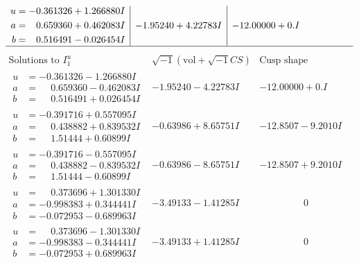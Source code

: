 \documentclass[1p]{elsarticle_modified}
\theoremstyle{definition}
\newcommand{\I}{\sqrt{-1}}
\begin{document}
$$\begin{array}{c|c|c}
\begin{aligned}
u &= -0.361326 + 1.266880 I \\
a &= \phantom{-}0.659360 + 0.462083 I \\
b &= \phantom{-}0.516491 - 0.026454 I\end{aligned}
 & -1.95240 + 4.22783 I & -12.00000 + 0. I\phantom{ +0.000000I}\\
 \hline 
 \end{array}$$\newpage$$\begin{array}{c|c|c}  
\text{Solutions to }I^u_{1}& \I (\text{vol} + \sqrt{-1}CS) & \text{Cusp shape}\\
 \hline 
\begin{aligned}
u &= -0.361326 - 1.266880 I \\
a &= \phantom{-}0.659360 - 0.462083 I \\
b &= \phantom{-}0.516491 + 0.026454 I\end{aligned}
 & -1.95240 - 4.22783 I & -12.00000 + 0. I\phantom{ +0.000000I} \\ \hline\begin{aligned}
u &= -0.391716 + 0.557095 I \\
a &= \phantom{-}0.438882 + 0.839532 I \\
b &= \phantom{-}1.51444 + 0.60899 I\end{aligned}
 & -0.63986 + 8.65751 I & -12.8507 - 9.2010 I \\ \hline\begin{aligned}
u &= -0.391716 - 0.557095 I \\
a &= \phantom{-}0.438882 - 0.839532 I \\
b &= \phantom{-}1.51444 - 0.60899 I\end{aligned}
 & -0.63986 - 8.65751 I & -12.8507 + 9.2010 I \\ \hline\begin{aligned}
u &= \phantom{-}0.373696 + 1.301330 I \\
a &= -0.998383 + 0.344441 I \\
b &= -0.072953 - 0.689963 I\end{aligned}
 & -3.49133 - 1.41285 I & \phantom{-0.000000 } 0 \\ \hline\begin{aligned}
u &= \phantom{-}0.373696 - 1.301330 I \\
a &= -0.998383 - 0.344441 I \\
b &= -0.072953 + 0.689963 I\end{aligned}
 & -3.49133 + 1.41285 I & \phantom{-0.000000 } 0 \\ \hline\begin{aligned}

\end{aligned}
\end{array}$$
\end{document}
